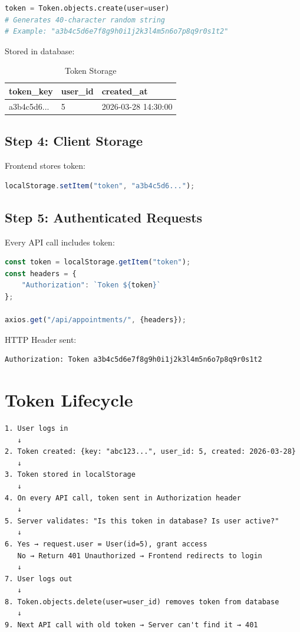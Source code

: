 \documentclass[11pt,a4paper,twoside]{report}
\begin{document}
\begin{lstlisting}[language=Python]
token = Token.objects.create(user=user)
# Generates 40-character random string
# Example: "a3b4c5d6e7f8g9h0i1j2k3l4m5n6o7p8q9r0s1t2"
\end{lstlisting}

Stored in database:

\begin{table}[H]
\centering
\begin{tabular}{|l|l|l|}
\hline
\textbf{token\_key} & \textbf{user\_id} & \textbf{created\_at} \\
\hline
a3b4c5d6... & 5 & 2026-03-28 14:30:00 \\
\hline
\end{tabular}
\caption{Token Storage}
\end{table}

\subsection{Step 4: Client Storage}

Frontend stores token:
\begin{lstlisting}[language=JavaScript]
localStorage.setItem("token", "a3b4c5d6...");
\end{lstlisting}

\subsection{Step 5: Authenticated Requests}

Every API call includes token:
\begin{lstlisting}[language=JavaScript]
const token = localStorage.getItem("token");
const headers = {
    "Authorization": `Token ${token}`
};

axios.get("/api/appointments/", {headers});
\end{lstlisting}

HTTP Header sent:
\begin{verbatim}
Authorization: Token a3b4c5d6e7f8g9h0i1j2k3l4m5n6o7p8q9r0s1t2
\end{verbatim}

\section{Token Lifecycle}

\begin{verbatim}
1. User logs in
   ↓
2. Token created: {key: "abc123...", user_id: 5, created: 2026-03-28}
   ↓
3. Token stored in localStorage
   ↓
4. On every API call, token sent in Authorization header
   ↓
5. Server validates: "Is this token in database? Is user active?"
   ↓
6. Yes → request.user = User(id=5), grant access
   No → Return 401 Unauthorized → Frontend redirects to login
   ↓
7. User logs out
   ↓
8. Token.objects.delete(user=user_id) removes token from database
   ↓
9. Next API call with old token → Server can't find it → 401
\end{verbatim}
\end{document}
